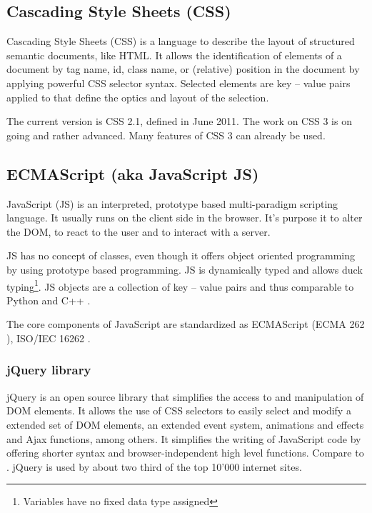 \subsection{Cascading Style Sheets (CSS)}
\label{sec:css}

Cascading Style Sheets (CSS) is a language to describe the layout of structured semantic documents, like HTML.
It allows the identification of elements of a document by tag name, id, class name, or (relative) position in the document by applying powerful CSS selector syntax.
Selected elements are key -- value pairs applied to that define the optics and layout of the selection.


The current version is CSS 2.1\cite{css_spec}, defined in June 2011. The work on CSS 3 is on going and rather advanced\cite{css_stat}. Many features of CSS 3 can already be used\cite{caniuse_css}.


\subsection{ECMAScript (aka JavaScript JS)}
\label{sec:js}
JavaScript (JS) is an interpreted, prototype based multi-paradigm scripting language.
It usually runs on the client side in the browser. It's purpose it to alter the DOM, to react to the user and to interact with a server.

JS has no concept of classes, even though it offers object oriented programming by using prototype based programming.
JS is dynamically typed and allows duck typing\footnote{Variables have no fixed data type assigned}.
JS objects are a collection of key -- value pairs and thus comparable to Python  and C++ .


The core components of JavaScript are standardized as ECMAScript (ECMA 262 \cite{js_std}), ISO/IEC 16262 \cite{js_iso}.


\subsubsection{jQuery library}
\label{sec:jquery}
jQuery is an open source library that simplifies the access to and manipulation of DOM elements.
It allows the use of CSS selectors to easily select and modify a extended set of DOM elements, an extended event system, animations and effects and Ajax functions, among others.
It simplifies the writing of JavaScript code by offering shorter syntax and browser-independent high level functions.
Compare  to .
jQuery is used by about two third of the top 10'000 internet sites\cite{jquery_usage}.

